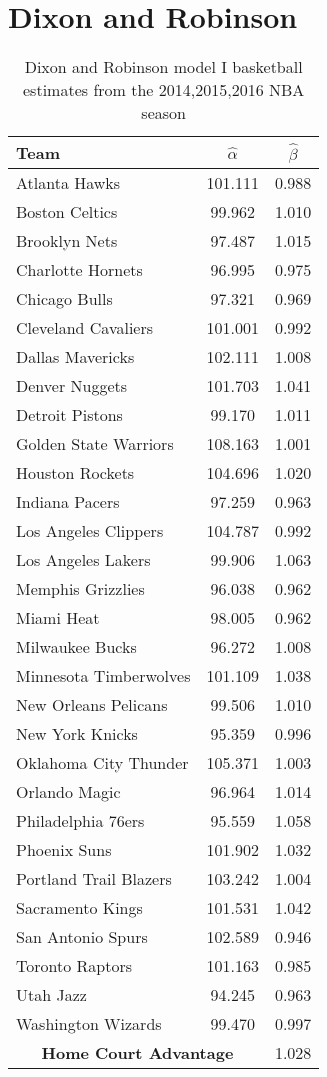 \section{Dixon and Robinson}

\begin{table}[t]
\centering
\caption{Dixon and Robinson model I basketball estimates from the 2014,2015,2016 NBA season}
\begin{tabular}{|l|c|c|}
\hline
\textbf{Team}  & \textbf{$\hat{\alpha}$} & \textbf{$\hat{\beta}$} \\ \hline
Atlanta Hawks  & 101.111 & 0.988\\ \hline
Boston Celtics & 99.962 & 1.010\\ \hline
Brooklyn Nets  & 97.487 & 1.015\\ \hline
Charlotte Hornets & 96.995 & 0.975\\ \hline
Chicago Bulls & 97.321 & 0.969\\ \hline
Cleveland Cavaliers & 101.001 & 0.992\\ \hline
Dallas Mavericks & 102.111 & 1.008 \\ \hline
Denver Nuggets & 101.703 & 1.041\\ \hline
Detroit Pistons & 99.170 & 1.011\\ \hline
Golden State Warriors & 108.163 & 1.001\\ \hline
Houston Rockets & 104.696 & 1.020 \\ \hline
Indiana Pacers & 97.259 & 0.963 \\ \hline
Los Angeles Clippers & 104.787 & 0.992\\ \hline
Los Angeles Lakers & 99.906 & 1.063 \\ \hline
Memphis Grizzlies & 96.038 & 0.962\\ \hline
Miami Heat & 98.005 & 0.962 \\ \hline
Milwaukee Bucks & 96.272 & 1.008\\ \hline
Minnesota Timberwolves & 101.109 & 1.038\\ \hline
New Orleans Pelicans & 99.506 & 1.010\\ \hline
New York Knicks & 95.359 & 0.996\\ \hline
Oklahoma City Thunder & 105.371 & 1.003\\ \hline
Orlando Magic & 96.964 & 1.014\\ \hline
Philadelphia 76ers & 95.559 & 1.058\\ \hline
Phoenix Suns & 101.902 & 1.032\\ \hline
Portland Trail Blazers & 103.242 & 1.004\\ \hline
Sacramento Kings & 101.531  & 1.042\\ \hline
San Antonio Spurs & 102.589 & 0.946\\ \hline
Toronto Raptors & 101.163 & 0.985 \\ \hline
Utah Jazz & 94.245 & 0.963 \\ \hline
Washington Wizards & 99.470  & 0.997\\ \hline
\multicolumn{2}{|c|}{\textbf{Home Court Advantage}} & 1.028\\ \hline
\end{tabular}
\label{table:dr_1_141516}
\end{table}